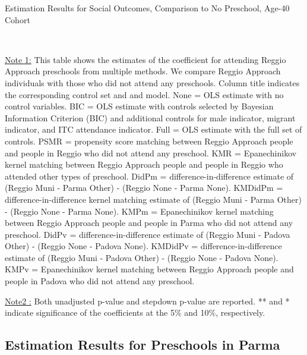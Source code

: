 \begin{table}[H] \caption{Estimation Results for Social Outcomes, Comparison to No Preschool, Age-40 Cohort} \label{ols-S-adult40-reg-none}
\scalebox{0.6}{}
\vspace{1ex} \\
\footnotesize\raggedright{\underline{Note 1:} This table shows the estimates of the coefficient for attending Reggio Approach preschools from multiple methods. We compare Reggio Approach individuals with those who did not attend any preschools. Column title indicates the corresponding control set and and model. None = OLS estimate with no control variables. BIC = OLS estimate with controls selected by Bayesian Information Criterion (BIC) and additional controls for male indicator, migrant indicator, and ITC attendance indicator. Full = OLS estimate with the full set of controls. PSMR =  propensity score matching between Reggio Approach people and people in Reggio who did not attend any preschool. KMR = Epanechinikov kernel matching between Reggio Approach people and people in Reggio who attended other types of preschool. DidPm = difference-in-difference estimate of (Reggio Muni - Parma Other) - (Reggio None - Parma None).  KMDidPm = difference-in-difference kernel matching estimate of (Reggio Muni - Parma Other) - (Reggio None - Parma None).  KMPm = Epanechinikov kernel matching between Reggio Approach people and people in Parma who did not attend any preschool. DidPv = difference-in-difference estimate of (Reggio Muni - Padova Other) - (Reggio None - Padova None). KMDidPv = difference-in-difference estimate of (Reggio Muni - Padova Other) - (Reggio None - Padova None).  KMPv = Epanechinikov kernel matching between Reggio Approach people and people in Padova who did not attend any preschool.}

\footnotesize\raggedright{\underline{Note2 :} Both unadjusted p-value and stepdown p-value are reported. ** and * indicate significance of the coefficients at the 5\% and 10\%, respectively.}
\end{table}
















\subsection{Estimation Results for Preschools in Parma}

